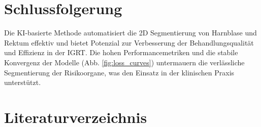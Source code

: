\documentclass{article}
\begin{document}
\section{Schlussfolgerung}
Die KI-basierte Methode automatisiert die 2D Segmentierung von Harnblase
und Rektum effektiv und bietet Potenzial zur Verbesserung der Behandlungsqualität
und Effizienz in der IGRT. Die hohen Performancemetriken und die stabile
Konvergenz der Modelle (Abb. \ref{fig:loss_curves}) untermauern die
verlässliche Segmentierung der Risikoorgane, was den Einsatz in der klinischen
Praxis unterstützt.

\section{Literaturverzeichnis}
 
 
\end{document}
